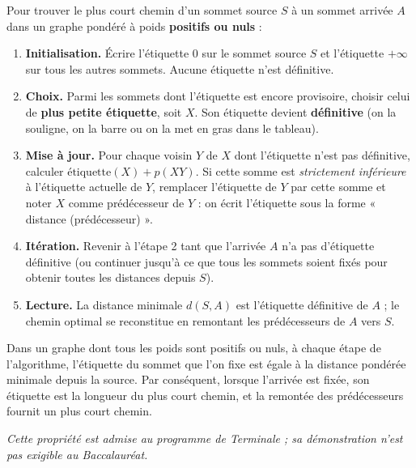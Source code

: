 \documentclass[11pt]{article}
\newcommand{\cle}[1]{{\popxbold\color{popdark}#1}}
\begin{document}
\begin{methode}
Pour trouver le plus court chemin d'un sommet source $S$ à un sommet arrivée $A$ dans un graphe pondéré à poids \textbf{positifs ou nuls} :
\begin{enumerate}
\item \textbf{Initialisation.} Écrire l'étiquette $0$ sur le sommet source $S$ et l'étiquette $+\infty$ sur tous les autres sommets. Aucune étiquette n'est définitive.
\item \textbf{Choix.} Parmi les sommets dont l'étiquette est encore provisoire, choisir celui de \textbf{plus petite étiquette}, soit $X$. Son étiquette devient \textbf{définitive} (on la souligne, on la barre ou on la met en gras dans le tableau).
\item \textbf{Mise à jour.} Pour chaque voisin $Y$ de $X$ dont l'étiquette n'est pas définitive, calculer $\text{étiquette}(X) + p(XY)$. Si cette somme est \emph{strictement inférieure} à l'étiquette actuelle de $Y$, remplacer l'étiquette de $Y$ par cette somme et noter $X$ comme \cle{prédécesseur} de $Y$ : on écrit l'étiquette sous la forme « distance (prédécesseur) ».
\item \textbf{Itération.} Revenir à l'étape 2 tant que l'arrivée $A$ n'a pas d'étiquette définitive (ou continuer jusqu'à ce que tous les sommets soient fixés pour obtenir toutes les distances depuis $S$).
\item \textbf{Lecture.} La distance minimale $d(S,A)$ est l'étiquette définitive de $A$ ; le chemin optimal se reconstitue en remontant les prédécesseurs de $A$ vers $S$.
\end{enumerate}
\end{methode}

\begin{propriete}
Dans un graphe dont tous les poids sont positifs ou nuls, à chaque étape de l'algorithme, l'étiquette du sommet que l'on fixe est égale à la distance pondérée minimale depuis la source. Par conséquent, lorsque l'arrivée est fixée, son étiquette est la longueur du plus court chemin, et la remontée des prédécesseurs fournit un plus court chemin.
\par\smallskip
\emph{Cette propriété est admise au programme de Terminale ; sa démonstration n'est pas exigible au Baccalauréat.}
\end{propriete}
\end{document}
